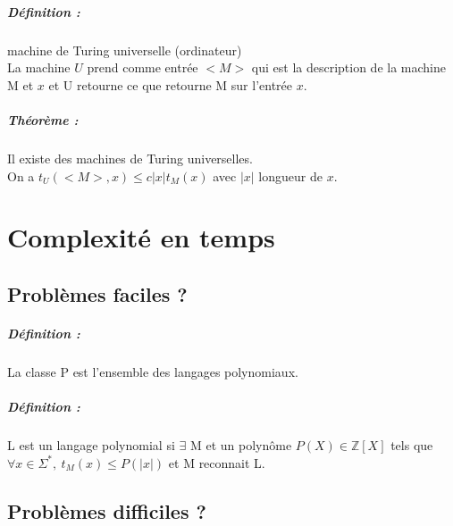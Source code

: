 \documentclass[12pt,a4paper]{report}
\begin{document}
\paragraph{Définition :} machine de Turing universelle (ordinateur)\\
La machine $U$ prend comme entrée $<M>$ qui est la description de la machine M et $x$ et U retourne ce que retourne M sur l'entrée $x$.
\paragraph{Théorème :\\}
Il existe des machines de Turing universelles.\\
On a $t_U(<M>, x) \leqslant c |x| t_M(x)$ avec $|x|$ longueur de $x$.

\chapter{Complexité en temps}
\section{Problèmes faciles ?}
\paragraph{Définition :\\}
La classe P est l'ensemble des langages polynomiaux.
\paragraph{Définition :\\}
L est un langage polynomial si $\exists$ M et un polynôme $P(X) \in \mathbb{Z}[X]$ tels que $ \forall x \in \Sigma^*,\ t_M(x) \leqslant P(|x|)$ et M reconnait L.

\section{Problèmes difficiles ?}
\end{document}
